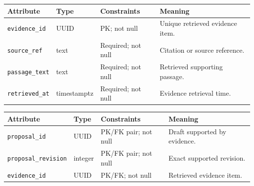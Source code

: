\begin{reporttable}
\setlength{\tabcolsep}{5pt}
\centering
\small
\caption{EvidenceItem attributes, types and constraints.}
\label{tab:kashaf:dict-evidenceitem}
\begin{tabular}{|p{}|p{}|p{}|p{}|}
\hline
Attribute & Type & Constraints & Meaning \\ \hline
\texttt{evidence\_id} & UUID & PK; not null & Unique retrieved evidence item. \\ \hline
\texttt{source\_ref} & text & Required; not null & Citation or source reference. \\ \hline
\texttt{passage\_text} & text & Required; not null & Retrieved supporting passage. \\ \hline
\texttt{retrieved\_at} & timestamptz & Required; not null & Evidence retrieval time. \\ \hline
\end{tabular}
\end{reporttable}

\begin{reporttable}
\setlength{\tabcolsep}{5pt}
\centering
\small
\caption{ProposalEvidence attributes, types and constraints.}
\label{tab:kashaf:dict-proposalevidence}
\begin{tabular}{|p{}|p{}|p{}|p{}|}
\hline
Attribute & Type & Constraints & Meaning \\ \hline
\texttt{proposal\_id} & UUID & PK/FK pair; not null & Draft supported by evidence. \\ \hline
\texttt{proposal\_revision} & integer & PK/FK pair; not null & Exact supported revision. \\ \hline
\texttt{evidence\_id} & UUID & PK/FK; not null & Retrieved evidence item. \\ \hline
\end{tabular}
\end{reporttable}

